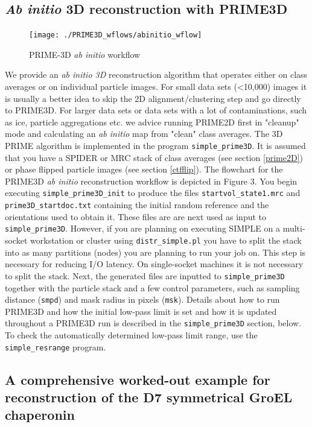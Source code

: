 \documentclass[a4paper,11pt]{article}
\newcommand{\prgname}[1]{\textcolor{NavyBlue}{\texttt{#1}}}
\begin{document}
\subsection{\textit{Ab initio} 3D reconstruction with PRIME3D}
\label{prime3D}
\begin{figure}
\texttt{[image: ./PRIME3D\_wflows/abinitio\_wflow]}
\caption{PRIME-3D \textit{ab initio} workflow}
\end{figure}
We provide an \textit{ab initio 3D} reconstruction algorithm that operates either on class averages or on individual particle images. For small data sets (<10,000) images it is usually a better idea to skip the 2D alignment/clustering step and go directly to PRIME3D. For larger data sets or data sets with a lot of contaminations, such as ice, particle aggregations etc. we advice running PRIME2D first in "cleanup" mode and calculating an \textit{ab initio} map from "clean" class averages. The 3D PRIME algorithm is implemented in the program \prgname{simple\_prime3D}. It is assumed that you have a SPIDER or MRC stack of class averages (see section \ref{prime2D}) or phase flipped particle images (see section \ref{ctfflip}). The flowchart for the PRIME3D \textit{ab initio} reconstruction workflow is depicted in Figure 3. You begin executing \prgname{simple\_prime3D\_init} to produce the files \texttt{startvol\_state1.mrc} and \texttt{prime3D\_startdoc.txt} containing the initial random reference and the orientations used to obtain it. These files are are next used as input to \prgname{simple\_prime3D}. However, if you are planning on executing SIMPLE on a multi-socket workstation or cluster using \prgname{distr\_simple.pl} you have to split the stack into as many partitions (nodes) you are planning to run your job on. This step is necessary for reducing I/O latency. On single-socket machines it is not necessary to split the stack. Next, the generated files are inputted to \prgname{simple\_prime3D} together with the particle stack and a few control parameters, such as sampling distance (\texttt{smpd}) and mask radius in pixels (\texttt{msk}). Details about how to run PRIME3D and how the initial low-pass limit is set and how it is updated throughout a PRIME3D run is described in the \prgname{simple\_prime3D} section, below. To check the automatically determined low-pass limit range, use the \prgname{simple\_resrange} program.

\subsection{A comprehensive worked-out example for reconstruction of the D7 symmetrical GroEL chaperonin}
\end{document}
